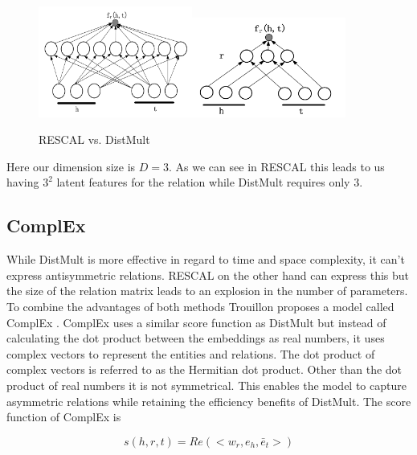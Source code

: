 \begin{figure}[H]
\centering
\includegraphics[width=0.45\textwidth]{images/rescal.png}\includegraphics[width=0.45\textwidth]{images/distmult.png}
\caption{RESCAL vs. DistMult}
\label{fig:rescal_distmult}
\end{figure}

Here our dimension size is $D=3$. As we can see in RESCAL this leads to us having $3^2$ latent features for the relation while DistMult requires only $3$.

\subsection{ComplEx}
\label{cha:complex}
While DistMult is more effective in regard to time and space complexity, it can't express antisymmetric relations. RESCAL on the other hand can express this but the size of the relation matrix leads to an explosion in the number of parameters. 
To combine the advantages of both methods Trouillon proposes a model called ComplEx  \cite{trouillon_complex_2016}. ComplEx uses a similar score function as DistMult but instead of calculating the dot product between the embeddings as real numbers, it uses complex vectors to represent the entities and relations. The dot product of complex vectors is referred to as the Hermitian dot product. Other than the dot product of real numbers it is not symmetrical. This enables the model to capture asymmetric relations while retaining the efficiency benefits of DistMult. The score function of ComplEx is 

\begin{equation}
\label{score_complex}
s(h,r,t)=Re(<w_r,e_h,\bar{e}_t>)
\end{equation}

